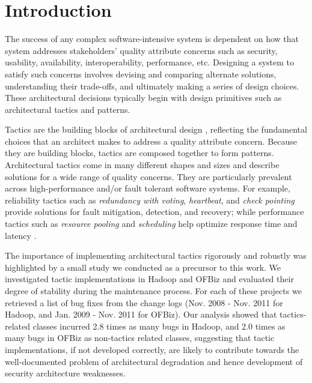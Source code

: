 \documentclass[conference]{IEEEtran}
\begin{document}




%
\IEEEpeerreviewmaketitle



\section{Introduction}
The success of any complex software-intensive system is dependent on how that system addresses stakeholders' quality attribute concerns such as security, usability, availability, interoperability, performance, etc. Designing a system to satisfy such concerns involves devising and comparing alternate solutions, understanding their trade-offs, and ultimately making a series of design choices. These architectural decisions typically begin with design primitives such as architectural tactics and patterns.

Tactics are the building blocks of architectural design \cite{bass:arch12}, reflecting the fundamental choices that an architect makes to address a  quality attribute concern. Because they are building blocks, tactics are composed together to form patterns. Architectural tactics come in many different shapes and sizes and describe solutions for a wide range of quality concerns.  They are particularly prevalent across high-performance and/or fault tolerant software systems.  For example, reliability tactics such as \emph{redundancy with voting}, \emph{heartbeat}, and \emph{check pointing} provide solutions for fault mitigation, detection, and recovery; while performance tactics such as \emph{resource pooling} and \emph{scheduling} help optimize response time and latency .


The importance of implementing architectural tactics rigorously and robustly was highlighted by a small study we conducted as a precursor to this work.  We investigated tactic implementations in Hadoop  and OFBiz and evaluated their degree of stability during the maintenance process.  For each of these projects we retrieved a list of bug fixes from the change logs (Nov. 2008 - Nov. 2011 for Hadoop, and Jan. 2009 - Nov. 2011 for OFBiz). Our analysis showed that tactics-related classes incurred 2.8 times as many bugs in Hadoop, and 2.0 times as many bugs in OFBiz as non-tactics related classes, suggesting that tactic implementations, if not developed correctly, are likely to contribute towards the well-documented problem of architectural degradation \cite{Erosion} and hence development of security architecture weaknesses.
\end{document}
